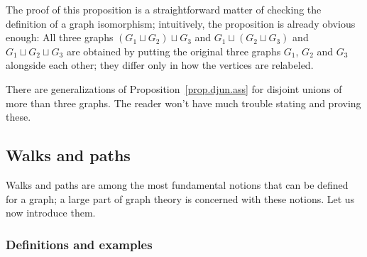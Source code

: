 \documentclass[numbers=enddot,12pt,final,onecolumn,notitlepage]{scrartcl}%
\theoremstyle{definition}
\newcommand{\tup}[1]{\left( #1 \right)}
\begin{document}
The proof of this proposition is a straightforward
matter of checking the definition of a graph isomorphism;
intuitively, the proposition is already obvious enough:
All three graphs $\tup{G_1 \sqcup G_2} \sqcup G_3$ and
$G_1 \sqcup \tup{G_2 \sqcup G_3}$ and
$G_1 \sqcup G_2 \sqcup G_3$ are obtained by
putting the original three graphs $G_1$, $G_2$ and
$G_3$ alongside each other; they differ only in how
the vertices are relabeled.

There are generalizations of Proposition~\ref{prop.djun.ass}
for disjoint unions of more than three graphs. The reader
won't have much trouble stating and proving these.

\subsection{\label{sect.intro.walks}Walks and paths}

Walks and paths are among the most fundamental notions that can be
defined for a graph; a large part of graph theory is concerned with
these notions. Let us now introduce them.

\subsubsection{Definitions and examples}
\end{document}

